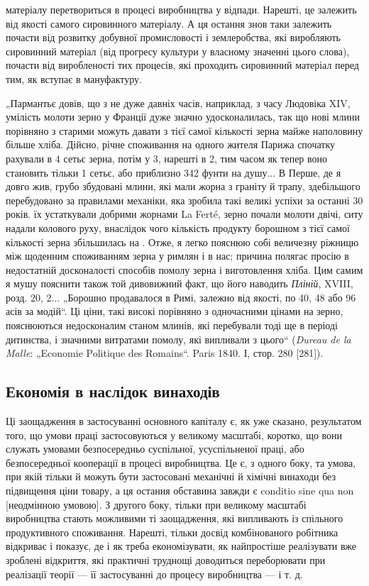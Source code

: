 \parcont{}  %
матеріалу перетвориться в процесі виробництва у відпади. Нарешті, це залежить від якості самого
сировинного матеріалу. А ця остання знов таки залежить почасти від розвитку добувної промисловості і
землеробства, які виробляють сировинний матеріал (від прогресу культури у власному значенні цього
слова), почасти від виробленості тих процесів, які проходить
сировинний матеріал перед тим, як вступає в мануфактуру.

„Пармантьє довів, що з не дуже давніх часів, наприклад, з часу Людовіка XIV, умілість молоти зерно у
Франції дуже
значно удосконалилась, так що нові млини порівняно з старими
можуть давати з тієї самої кількості зерна майже наполовину
більше хліба. Дійсно, річне споживання на одного жителя Парижа
спочатку рахували в 4 сетьє зерна, потім у 3, нарешті в 2, тим часом як тепер воно становить тільки
1 сетьє, або приблизно
342 фунти на душу... В Перше, де я довго жив, грубо збудовані млини, які мали жорна з граніту й
трапу, здебільшого перебудовано за правилами механіки, яка зробила такі великі успіхи за останні 30
років. їх устаткували добрими жорнами La Ferté,
зерно почали молоти двічі, ситу надали колового руху, внаслідок чого кількість продукту борошном з
тієї самої кількості
зерна збільшилась на . Отже, я легко пояснюю собі величезну
ріжницю між щоденним споживанням зерна у римлян і в нас;
причина полягає просію в недостатній досконалості способів
помолу зерна і виготовлення хліба. Цим самим я мушу пояснити
також той дивовижний факт, що його наводить \emph{Пліній}, XVIII,
розд. 20, 2... „Борошно продавалося в Римі, залежно від якості,
по 40, 48 або 96 асів за модій“. Ці ціни, такі високі порівняно
з одночасними цінами на зерно, пояснюються недосконалим станом млинів, які перебували тоді ще в
періоді дитинства, і значними витратами помолу, які випливали з цього“ (\emph{Dureau de la Malle}:
„Economie Politique des Romains“. Paris 1840. І, стор.
280 [281]).

\subsection{Економія в наслідок винаходів}

Ці заощадження в застосуванні основного капіталу є, як уже
сказано, результатом того, що умови праці застосовуються
у великому масштабі, коротко, що вони служать умовами безпосередньо суспільної, усуспільненої праці,
або безпосередньої
кооперації в процесі виробництва. Це є, з одного боку, та умова,
при якій тільки й можуть бути застосовані механічні й хімічні
винаходи без підвищення ціни товару, а ця остання обставина
завжди є conditio sine qua non [неодмінною умовою]. З другого
боку, тільки при великому масштабі виробництва стають можливими ті заощадження, які випливають із
спільного продуктивного
споживання. Нарешті, тільки досвід комбінованого робітника відкриває і показує, де і як треба
економізувати, як найпростіше
реалізувати вже зроблені відкриття, які практичні труднощі доводиться
переборювати при реалізації теорії — її застосуванні до
процесу виробництва — і т. д.

